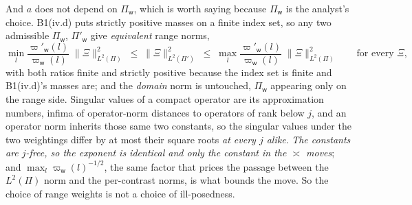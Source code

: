 And $a$ does not depend on $\Pi_{\mathsf w}$, which is worth saying because $\Pi_{\mathsf w}$ is the
analyst's choice. B1(iv.d) puts strictly positive masses on a finite index set, so any two admissible
$\Pi_{\mathsf w}$, $\Pi'_{\mathsf w}$ give \emph{equivalent} range norms,
\[
\min_{l}\frac{\varpi'_{\mathsf w}(l)}{\varpi_{\mathsf w}(l)}\;\|\Xi\|^{2}_{L^{2}(\Pi)}
\;\le\;\|\Xi\|^{2}_{L^{2}(\Pi')}\;\le\;
\max_{l}\frac{\varpi'_{\mathsf w}(l)}{\varpi_{\mathsf w}(l)}\;\|\Xi\|^{2}_{L^{2}(\Pi)}
\qquad\text{for every }\Xi ,
\]
with both ratios finite and strictly positive because the index set is finite and B1(iv.d)'s masses are;
and the \emph{domain} norm is untouched, $\Pi_{\mathsf w}$ appearing only on the range side. Singular
values of a compact operator are its approximation numbers, infima of operator-norm distances to
operators of rank below $j$, and an operator norm inherits those same two constants, so the singular
values under the two weightings differ by at most their square roots \emph{at every $j$ alike}. \emph{The
constants are $j$-free, so the exponent is identical and only the constant in the $\asymp$ moves}; and
$\max_l\varpi_{\mathsf w}(l)^{-1/2}$, the same factor that prices the passage between the
$L^{2}(\Pi)$ norm and the per-contrast norms, is what bounds the move. So the choice of range
weights is not a choice of ill-posedness.

